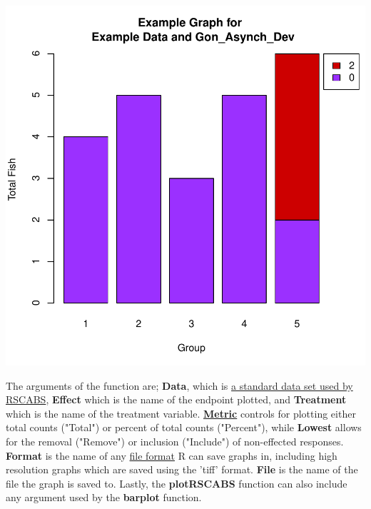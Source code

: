 \documentclass[a4paper]{article}
\begin{document}
\begin{center}

\par


\includegraphics{RSCABS-001}
\end{center}


The arguments of the function are; \textbf{Data}, which 
is \hyperref[subsec:Data]{a standard data set used by RSCABS}, \textbf{Effect} which is 
the name of the endpoint plotted, and \textbf{Treatment} which is the name
of the treatment variable.  \hyperlink{here:metric}{\textbf{Metric}} controls for plotting either total counts ("Total") 
or percent of total counts ("Percent"), while 
\textbf{Lowest} allows for the removal ("Remove") or inclusion ("Include") of non-effected responses. \textbf{Format} is the name of any 
\hyperlink{fig:PlottingFormates}{file format} R can save graphs in, including high resolution graphs which are saved using the 'tiff' format. \textbf{File} is the name of the file the graph is saved to. 
Lastly, the \textbf{plotRSCABS} function can also include any argument used by the \textbf{barplot} function.              
\end{document}
